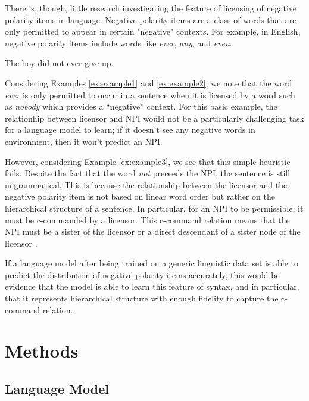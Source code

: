 \documentclass[11pt, round]{article}
\begin{document}
There is, though, little research investigating the feature of licensing of negative polarity items in language. Negative polarity items are a class of words that are only permitted to appear in certain "negative" contexts. For example, in English, negative polarity items include words like \textit{ever}, \textit{any}, and \textit{even}.
\begin{exe}
\ex \begin{xlist}
\ex \label{ex:example1} The boy did not ever give up.
\end{xlist}
\end{exe}
Considering Examples \ref{ex:example1} and \ref{ex:example2}, we note that the word \textit{ever} is only permitted to occur in a sentence when it is licensed by a word such as \textit{nobody} which provides a ``negative'' context. For this basic example, the relationhip between licensor and NPI would not be a particularly challenging task for a language model to learn; if it doesn't see any negative words in environment, then it won't predict an NPI. 

However, considering Example \ref{ex:example3}, we see that this simple heuristic fails. Despite the fact that the word \textit{not} preceeds the NPI, the sentence is still ungrammatical. This is because the relationship between the licensor and the negative polarity item is not based on linear word order but rather on the hierarchical structure of a sentence. In particular, for an NPI to be permissible, it must be c-commanded by a licensor. This c-command relation means that the NPI must be a sister of the licensor or a direct descendant of a sister node of the licensor \cite{ladusaw1980notion}.

If a language model after being trained on a generic linguistic data set is able to predict the distribution of negative polarity items accurately, this would be evidence that the model is able to learn this feature of syntax, and in particular, that it represents hierarchical structure with enough fidelity to capture the c-command relation.

\section{Methods}

\subsection{Language Model}
\end{document}
